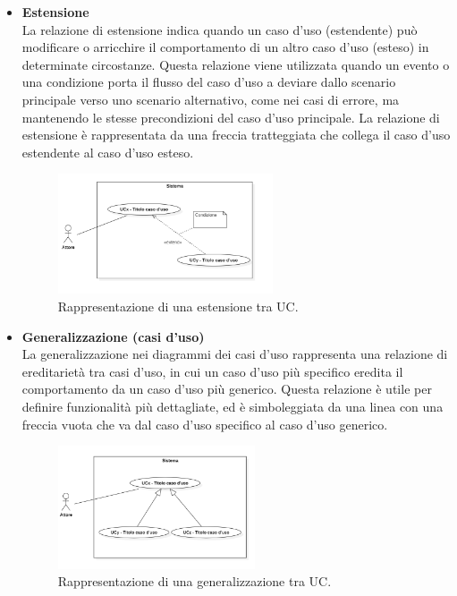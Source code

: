 \documentclass[10pt]{article}
\begin{document}
\begin{justify}
\begin{itemize}
            \item \textbf{Estensione}\\
            La relazione di estensione indica quando un caso d'uso (estendente) può modificare o arricchire il comportamento di un altro caso d'uso (esteso) in determinate circostanze. Questa relazione viene utilizzata quando un evento o una condizione porta il flusso del caso d'uso a deviare dallo scenario principale verso uno scenario alternativo, come nei casi di errore, ma mantenendo le stesse precondizioni del caso d'uso principale. La relazione di estensione è rappresentata da una freccia tratteggiata che collega il caso d'uso estendente al caso d'uso esteso.
            \begin{figure}[H]
            \centering
            \includegraphics[width=0.6\textwidth]{EstensioneUC.PNG}
            \caption{Rappresentazione di una estensione tra UC.}
            \end{figure}

            \item \textbf{Generalizzazione (casi d'uso)}\\
            La generalizzazione nei diagrammi dei casi d’uso rappresenta una relazione di ereditarietà tra casi d’uso, in cui un caso d’uso più specifico eredita il comportamento da un caso d’uso più generico. Questa relazione è utile per definire funzionalità più dettagliate, ed è simboleggiata da una linea con una freccia vuota che va dal caso d'uso specifico al caso d'uso generico.
            \begin{figure}[H]
            \centering
            \includegraphics[width=0.55\textwidth]{GeneralizzazioneUC.PNG}
            \caption{Rappresentazione di una generalizzazione tra UC.}
            \end{figure}
        \end{itemize}


\end{justify}
\end{document}
